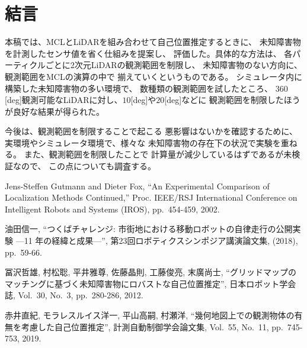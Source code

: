 \documentclass{jarticle}
\begin{document}
\section{結言}%

本稿では、MCLとLiDARを組み合わせて自己位置推定するときに、
未知障害物を計測したセンサ値を省く仕組みを提案し、
評価した。具体的な方法は、
各パーティクルごとに2次元LiDARの観測範囲を制限し、
未知障害物のない方向に、観測範囲をMCLの演算の中で
揃えていくというものである。
シミュレータ内に構築した未知障害物の多い環境で、
数種類の観測範囲を試したところ、
$360$[deg]観測可能なLiDARに対し、$10$[deg]や$20$[deg]などに
観測範囲を制限したほうが良好な結果が得られた。


今後は、観測範囲を制限することで起こる
悪影響はないかを確認するために、
実環境やシミュレータ環境で、様々な
未知障害物の存在下の状況で実験を重ねる。
また、観測範囲を制限したことで
計算量が減少しているはずであるが未検証なので、
この点についても調査する。




\footnotesize
\begin{thebibliography}{99}

  Jens-Steffen Gutmann and Dieter Fox, 
  ``An Experimental Comparison of Localization Methods Continued,''
  Proc. IEEE/RSJ International Conference on Intelligent Robots and Systems (IROS), pp.~454-459, 2002.

  油田信一, ``つくばチャレンジ: 市街地における移動ロボットの自律走行の公開実験 ---11 年の経緯と成果---'',
  第23回ロボティクスシンポジア講演論文集, (2018), pp.~59-66.
  
  冨沢哲雄, 村松聡, 平井雅尊, 佐藤晶則, 工藤俊亮, 末廣尚士, 
  ``グリッドマップのマッチングに基づく未知障害物にロバストな自己位置推定'', 日本ロボット学会誌, Vol.~30, No.~3, pp.~280-286, 2012.
  
  赤井直紀, モラレスルイス洋一, 平山高嗣, 村瀬洋, 
  ``幾何地図上での観測物体の有無を考慮した自己位置推定'', 計測自動制御学会論文集, Vol.~55, No.~11, pp.~745-753, 2019.
  

\end{thebibliography}

\normalsize
\end{document}
